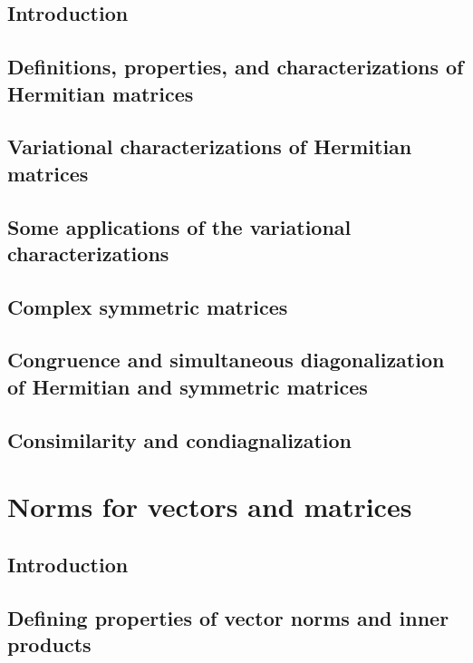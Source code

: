 \documentclass[a4paper]{article}
\newcommand{\todobox}{\textcolor{red}{\fbox{\phantom{--}}}}
\begin{document}
\subsection{Introduction}
\todobox
\subsection{Definitions, properties, and characterizations of Hermitian matrices}
\todobox
\subsection{Variational characterizations of Hermitian matrices}
\todobox
\subsection{Some applications of the variational characterizations}
\todobox
\subsection{Complex symmetric matrices}
\todobox
\subsection{Congruence and simultaneous diagonalization of Hermitian and symmetric matrices}
\todobox
\subsection{Consimilarity and condiagnalization}
\todobox

\newpage
\section{Norms for vectors and matrices}
\setcounter{subsection}{-1}
\subsection{Introduction}
\todobox
\subsection{Defining properties of vector norms and inner products}
\todobox
\end{document}
